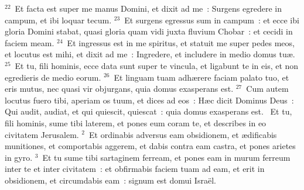 ${}^{22}$~Et facta est super me manus Domini, et dixit ad me~: Surgens egredere in campum, et ibi loquar tecum.
${}^{23}$~Et surgens egressus sum in campum~: et ecce ibi gloria Domini stabat, quasi gloria quam vidi juxta fluvium Chobar~: et cecidi in faciem meam.
${}^{24}$~Et ingressus est in me spiritus, et statuit me super pedes meos, et locutus est mihi, et dixit ad me~: Ingredere, et includere in medio domus tu\ae .
${}^{25}$~Et tu, fili hominis, ecce data sunt super te vincula, et ligabunt te in eis, et non egredieris de medio eorum.
${}^{26}$~Et linguam tuam adh\ae rere faciam palato tuo, et eris mutus, nec quasi vir objurgans, quia domus exasperans est.
${}^{27}$~Cum autem locutus fuero tibi, aperiam os tuum, et dices ad eos~: H\ae c dicit Dominus Deus~: Qui audit, audiat, et qui quiescit, quiescat~: quia domus exasperans est.
~Et tu, fili hominis, sume tibi laterem, et pones eum coram te, et describes in eo civitatem Jerusalem.
${}^{2}$~Et ordinabis adversus eam obsidionem, et \ae dificabis munitiones, et comportabis aggerem, et dabis contra eam castra, et pones arietes in gyro.
${}^{3}$~Et tu sume tibi sartaginem ferream, et pones eam in murum ferreum inter te et inter civitatem~: et obfirmabis faciem tuam ad eam, et erit in obsidionem, et circumdabis eam~: signum est domui Isra\"el.


